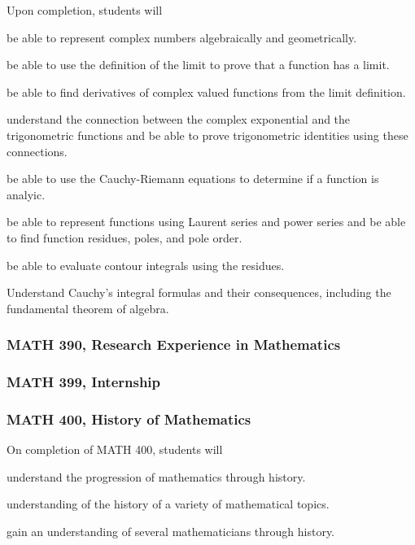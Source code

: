 Upon completion, students will 
\begin{alphalist}
    \item  be able to represent complex numbers algebraically and geometrically.
    \item be able to use the definition of the limit to prove that a function has a limit.
    \item be able to find derivatives of complex valued functions from the limit definition.
    \item understand the connection between the complex exponential and the trigonometric functions and be able to prove trigonometric identities using these connections.
    \item be able to use the Cauchy-Riemann equations to determine if a function is analyic.
    \item be able to represent functions using Laurent series and power series and be able to find function residues, poles, and pole order.
    \item be able to evaluate contour integrals using the residues.
    \item Understand Cauchy’s integral formulas and their consequences,  including the fundamental theorem of algebra.
\end{alphalist}


\subsubsection*{MATH 390, Research Experience in Mathematics}


\subsubsection*{MATH 399, Internship}


\subsubsection*{MATH 400, History of Mathematics}

On completion of MATH 400, students will 
\begin{alphalist}
    \item understand the progression of mathematics through history.
    \item understanding of the history of a variety of mathematical topics.
    \item gain an understanding of several mathematicians through history.
\end{alphalist}

